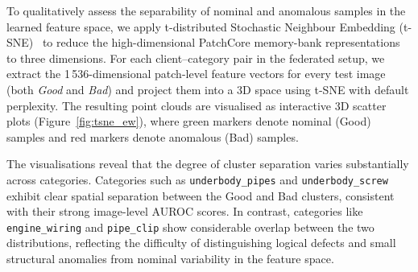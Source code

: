 \documentclass{article}
\begin{document}
\FloatBarrier

To qualitatively assess the separability of nominal and anomalous samples
in the learned feature space, we apply t-distributed Stochastic Neighbour
Embedding (t-SNE)~\cite{vanderMaaten2008} to reduce the high-dimensional
PatchCore memory-bank representations to three dimensions. For each
client--category pair in the federated setup, we extract the
1\,536-dimensional patch-level feature vectors for every test image (both
\emph{Good} and \emph{Bad}) and project them into a 3D space using t-SNE
with default perplexity. The resulting point clouds are visualised as
interactive 3D scatter plots (Figure~\ref{fig:tsne_ew}),
where green markers denote nominal (Good) samples and red markers denote
anomalous (Bad) samples.

The visualisations reveal that the degree of cluster separation varies
substantially across categories. Categories such as
\texttt{underbody\_pipes} and \texttt{underbody\_screw} exhibit clear
spatial separation between the Good and Bad clusters, consistent with
their strong image-level AUROC scores. In contrast, categories like
\texttt{engine\_wiring} and \texttt{pipe\_clip} show considerable overlap
between the two distributions, reflecting the difficulty of distinguishing
logical defects and small structural anomalies from nominal variability in
the feature space.
\end{document}
